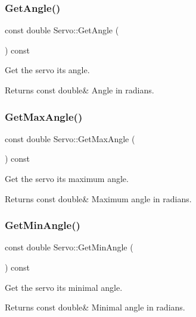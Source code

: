 \subsubsection{\texorpdfstring{GetAngle()}{GetAngle()}}
{\footnotesize\ttfamily const double Servo\+::\+Get\+Angle (\begin{DoxyParamCaption}{ }\end{DoxyParamCaption}) const}



Get the servo its angle. 

\begin{DoxyReturn}{Returns}
const double\& Angle in radians. 
\end{DoxyReturn}
\mbox{\label{classServo_a4f78f0ed210d9881b1f87c63a7a680a0}} 
\subsubsection{\texorpdfstring{GetMaxAngle()}{GetMaxAngle()}}
{\footnotesize\ttfamily const double Servo\+::\+Get\+Max\+Angle (\begin{DoxyParamCaption}{ }\end{DoxyParamCaption}) const}



Get the servo its maximum angle. 

\begin{DoxyReturn}{Returns}
const double\& Maximum angle in radians. 
\end{DoxyReturn}
\mbox{\label{classServo_ad534074ab9d9e72415d237510e559af5}} 
\subsubsection{\texorpdfstring{GetMinAngle()}{GetMinAngle()}}
{\footnotesize\ttfamily const double Servo\+::\+Get\+Min\+Angle (\begin{DoxyParamCaption}{ }\end{DoxyParamCaption}) const}



Get the servo its minimal angle. 

\begin{DoxyReturn}{Returns}
const double\& Minimal angle in radians. 
\end{DoxyReturn}
\mbox{\label{classServo_addcbaf416b54f183d24d6139f20f0312}} 
